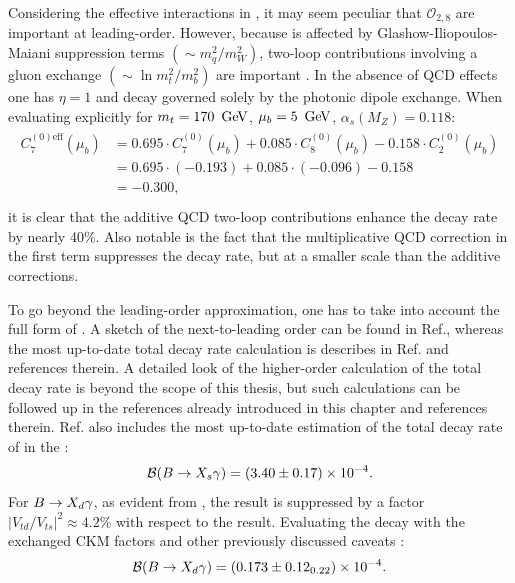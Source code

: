 Considering the effective interactions in , it may seem peculiar that $\mathcal{O}_{2,8}$ are important at leading-order.
However, because \BtoXsgamma is affected by Glashow-Iliopoulos-Maiani suppression terms $(\sim m_q^2/m_W^2)$, two-loop contributions involving a gluon exchange $(\sim\ln m_t^2/m_b^2)$ are important \cite{Bertolini:1986th}.
In the absence of QCD effects one has $\eta=1$ and \BtoXsgamma decay governed solely by the photonic dipole exchange.
When evaluating  explicitly for $m_t=170~\mathrm{\,Ge\kern -0.1em V}$, $\mu_b=5~\mathrm{\,Ge\kern -0.1em V}$, $\alpha_s(M_Z)=0.118$\cite{Buras:1998raa}:
\begin{align}
    \begin{split}
        C_7^{(0)\mathrm{eff}}(\mu_b) &= 0.695 \cdot C_7^{(0)}(\mu_b) + 0.085 \cdot C_8^{(0)}(\mu_b) - 0.158 \cdot C_2^{(0)}(\mu_b)  \\ 
                          &= 0.695 \cdot (-0.193) + 0.085 \cdot (-0.096) - 0.158\\
                          &= -0.300, \\
    \end{split}
\end{align}
it is clear that the additive QCD two-loop contributions enhance the decay rate by nearly 40\%.
Also notable is the fact that the multiplicative QCD correction in the first term suppresses the decay rate, but at a smaller scale than the additive corrections.

To go beyond the leading-order approximation, one has to take into account the full form of .
A sketch of the next-to-leading order can be found in Ref.\cite{Gambino:2001ew}, whereas the most up-to-date total decay rate calculation is describes in Ref.\cite{Misiak:2020vlo} and references therein.
A detailed look of the higher-order calculation of the total \BtoXsgamma decay rate is beyond the scope of this thesis, but such calculations can be followed up in the references already introduced in this chapter and references therein. 
Ref.\cite{Misiak:2020vlo} also includes the most up-to-date estimation of the total decay rate of \BtoXsgamma in the \SM:
\begin{equation}\label{eq:btosgamma_theoretical}
    \mathcal{B}(\BtoXsgamma) = (3.40\pm 0.17) \times 10^{-4}.
\end{equation}
For $\BtoXdgamma$, as evident from , the result is suppressed by a factor $|V_{td}/V_{ts}|^2\approx 4.2\%$ with respect to the \BtoXsgamma result.
Evaluating the decay with the exchanged CKM factors and other previously discussed caveats \cite{Misiak:2015xwa}:
\begin{equation}\label{eq:btodgamma_theoretical}
    \mathcal{B}(\BtoXdgamma) = (0.173\pm{0.12}_{0.22}) \times 10^{-4}.
\end{equation}

